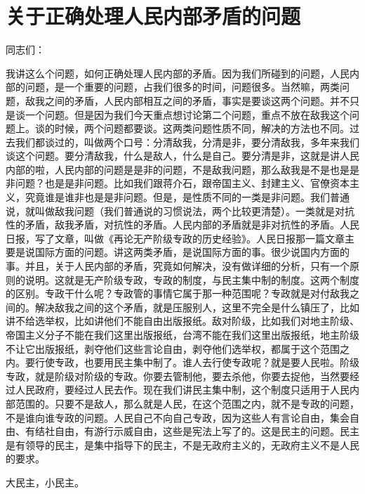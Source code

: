 \section[关于正确处理人民内部矛盾的问题（一九五七年二月二十七日）]{关于正确处理人民内部矛盾的问题}


同志们：

我讲这么个问题，如何正确处理人民内部的矛盾。因为我们所碰到的问题，人民内部的问题，是一个重要的问题，占我们很多的时间，问题很多。当然嘛，两类问题，敌我之间的矛盾，人民内部相互之间的矛盾，事实是要谈这两个问题。并不只是谈一个问题。但是因为我们今天重点想讨论第二个问题，重点不放在敌我这个问题上。谈的时候，两个问题都要谈。这两类问题性质不同，解决的方法也不同。过去我们都谈过的，叫做两个口号：分清敌我，分清是非，要分清敌我，多年来我们谈这个问题。要分清敌我，什么是敌人，什么是自己。要分清是非，这就是讲人民内部的啦，人民内部的问题是是非的问题，不是敌我问题，那么敌我是不是也是是非问题？也是是非问题。比如我们跟蒋介石，跟帝国主义、封建主义、官僚资本主义，究竟谁是谁非也是是非问题。但是，是性质不同的一类是非问题。我们普通说，就叫做敌我问题（我们普通说的习惯说法，两个比较更清楚）。一类就是对抗性的矛盾，敌我矛盾，对抗性的矛盾。人民内部的矛盾就是非对抗性的矛盾。人民日报，写了文章，叫做《再论无产阶级专政的历史经验》。人民日报那一篇文章主要是说国际方面的问题。讲这两类矛盾，是说国际方面的事。很少说国内方面的事。并且，关于人民内部的矛盾，究竟如何解决，没有做详细的分析，只有一个原则的说明。这就是无产阶级专政，专政的制度，与民主集中制的制度。这两个制度的区别。专政干什么呢？专政管的事情它属于那一种范围呢？专政就是对付敌我之间的。解决敌我之间的这个矛盾，就是压服别人，这里不完全是什么镇压了，比如讲不给选举权，比如讲他们不能自由出版报纸。敌对阶级，比如我们对地主阶级、帝国主义分子不能在我们这里出版报纸，台湾不能在我们这里出版报纸，地主阶级不让它出版报纸，剥夺他们这些言论自由，剥夺他们选举权，都属于这个范围之内。要行使专政，也要用民主集中制了。谁人去行使专政呢？就是要人民啦。阶级专政，就是阶级对阶级的专政。你要去管制他，要去杀他，你要去捉他，当然要经过人民政府，要经过人民去作。现在我们讲民主集中制，这个制度只适用于人民内部范围的。只要不是敌人，那么就是人民，在这个范围之内，就不是专政的问题，不是谁向谁专政的问题。人民自己不向自己专政，因为这些人有言论自由，集会自由、有结社自由，有游行示威自由，这些是宪法上写了的。这是民主的问题。民主是有领导的民主，是集中指导下的民主，不是无政府主义的，无政府主义不是人民的要求。

大民主，小民主。

